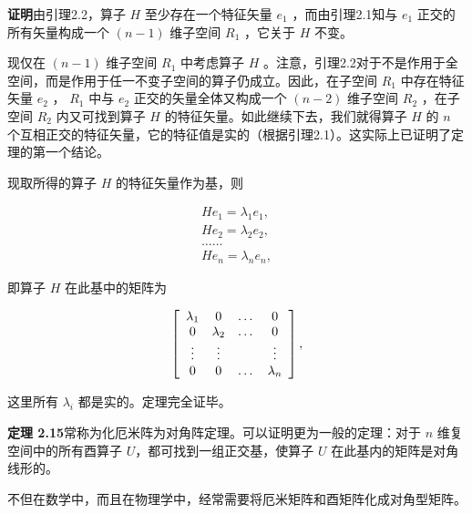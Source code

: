 \textbf{证明}\quad 由引理2.2，算子 $H$ 至少存在一个特征矢量 $e_1$ ，而由引理2.1知与 $e_1$ 正交的所有矢量构成一个 $(n - 1)$ 维子空间 $R_{1}$ ，它关于 $H$ 不变。

现仅在 $(n - 1)$ 维子空间 $R_{1}$ 中考虑算子 $H$ 。注意，引理2.2对于不是作用于全空间，而是作用于任一不变子空间的算子仍成立。因此，在子空间 $R_{1}$ 中存在特征矢量 $e_2$ ， $R_{1}$ 中与 $e_2$ 正交的矢量全体又构成一个 $(n - 2)$ 维子空间 $R_{2}$ ，在子空间 $R_{2}$ 内又可找到算子 $H$ 的特征矢量。如此继续下去，我们就得算子 $H$ 的 $n$ 个互相正交的特征矢量，它的特征值是实的（根据引理2.1）。这实际上已证明了定理的第一个结论。

现取所得的算子 $H$ 的特征矢量作为基，则

\begin{equation*}
\begin{array}{l} H e _ {1} = \lambda_ {1} e _ {1}, \\ H e _ {2} = \lambda_ {2} e _ {2}, \\ \dots \dots \\ H e _ {n} = \lambda_ {n} e _ {n}, \end{array}
\end{equation*}

即算子 $H$ 在此基中的矩阵为

\begin{equation*}
\left[ \begin{array}{c c c c} \lambda_ {1} & 0 & \dots & 0 \\ 0 & \lambda_ {2} & \dots & 0 \\ \vdots & \vdots & & \vdots \\ 0 & 0 & \dots & \lambda_ {n} \end{array} \right],
\end{equation*}

这里所有 $\lambda_{i}$ 都是实的。定理完全证毕。

\textbf{定理 2.15}\quad 常称为化厄米阵为对角阵定理。可以证明更为一般的定理：对于 $n$ 维复空间中的所有酉算子 $U$，都可找到一组正交基，使算子 $U$ 在此基内的矩阵是对角线形的。

不但在数学中，而且在物理学中，经常需要将厄米矩阵和酉矩阵化成对角型矩阵。
